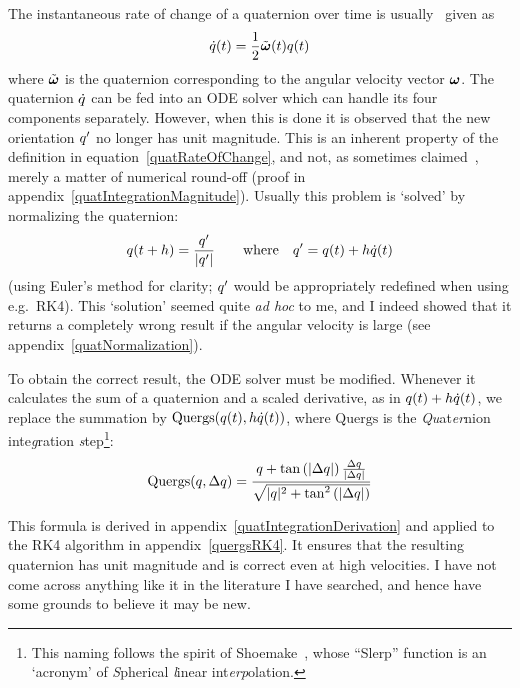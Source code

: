 The instantaneous rate of change of a quaternion  over time is
usually~\cite{BaraffWitkin:97,Eberly:04,Saunders:PhD} given as
\begin{equation}
\label{quatRateOfChange}
\dot{\q{q}}(t) = \frac{1}{2}\tilde{\ve{\omega}}(t)\q{q}(t)
\end{equation}
where $\tilde{\ve{\omega}}$ is the quaternion corresponding to the angular velocity
vector $\ve{\omega}$. The quaternion $\dot{q}$ can be fed into an ODE solver which can handle
its four components separately. However, when this is done it is observed that the new orientation
$q'$ no longer has unit magnitude. This is an inherent property of the definition in
equation~\ref{quatRateOfChange}, and not, as sometimes claimed~\cite{Eberly:04}, merely a matter
of numerical round-off (proof in appendix~\ref{quatIntegrationMagnitude}). Usually this problem
is `solved' by normalizing the quaternion:
\begin{equation}
q(t + h) = \frac{q'}{|q'|} \quad\quad\mathrm{where}\quad
    q' = q(t) + h\dot{q}(t)
\end{equation}
(using Euler's method for clarity; $q'$ would be appropriately redefined when using e.g.\ RK4).
This `solution' seemed quite \textsl{ad hoc} to me, and I indeed showed that it returns a
completely wrong result if the angular velocity is large (see appendix~\ref{quatNormalization}).

To obtain the correct result, the ODE solver must be modified. Whenever it calculates the sum of
a quaternion and a scaled derivative, as in $q(t) + h\dot{q}(t)$, we replace the summation
by $\mathrm{Quergs}(q(t), h\dot{q}(t))$, where $\mathrm{Quergs}$ is the
\emph{Qu}at\emph{er}nion inte\emph{g}ration \emph{s}tep\footnote{This naming follows the spirit of
Shoemake~\cite{Shoemake:85}, whose ``Slerp'' function is an `acronym' of \emph{S}pherical
\emph{l}inear int\emph{erp}olation.}:
\begin{equation}
\label{quergs}
\mathrm{Quergs}(q, \Delta q) =
    \frac{q + \tan\left(|\Delta q|\right)
        \frac{\Delta q}{|\Delta q|}}{
    \sqrt{|q|^2 + \tan^2\left(|\Delta q|\right)}}
\end{equation}

This formula is derived in appendix~\ref{quatIntegrationDerivation} and applied to the RK4
algorithm in appendix~\ref{quergsRK4}. It ensures that the resulting quaternion has unit magnitude
and is correct even at high velocities. I have not come across anything like it in the literature
I have searched, and hence have some grounds to believe it may be new.
